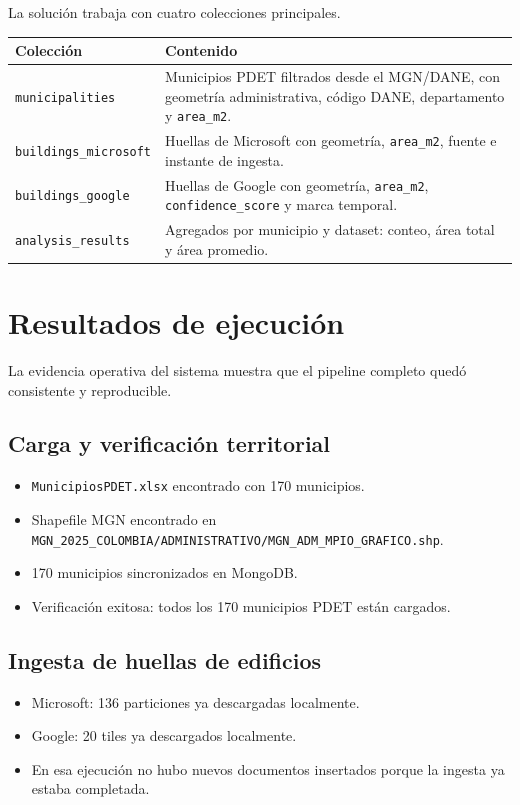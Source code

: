 \documentclass[12pt,a4paper]{article}
\begin{document}
La soluci\'on trabaja con cuatro colecciones principales.

\begin{longtable}{|p{4cm}|p{9.8cm}|}
\hline
\textbf{Colecci\'on} & \textbf{Contenido} \\\hline
\texttt{municipalities} & Municipios PDET filtrados desde el MGN/DANE, con geometr\'ia administrativa, c\'odigo DANE, departamento y \texttt{area\_m2}. \\\hline
\texttt{buildings\_microsoft} & Huellas de Microsoft con geometr\'ia, \texttt{area\_m2}, fuente e instante de ingesta. \\\hline
\texttt{buildings\_google} & Huellas de Google con geometr\'ia, \texttt{area\_m2}, \texttt{confidence\_score} y marca temporal. \\\hline
\texttt{analysis\_results} & Agregados por municipio y dataset: conteo, \'area total y \'area promedio. \\\hline
\end{longtable}

\section{Resultados de ejecuci\'on}

La evidencia operativa del sistema muestra que el pipeline completo qued\'o consistente y reproducible.

\subsection{Carga y verificaci\'on territorial}

\begin{itemize}
  \item \texttt{MunicipiosPDET.xlsx} encontrado con 170 municipios.
  \item Shapefile MGN encontrado en \texttt{MGN\_2025\_COLOMBIA/ADMINISTRATIVO/MGN\_ADM\_MPIO\_GRAFICO.shp}.
  \item 170 municipios sincronizados en MongoDB.
  \item Verificaci\'on exitosa: todos los 170 municipios PDET est\'an cargados.
\end{itemize}

\subsection{Ingesta de huellas de edificios}

\begin{itemize}
  \item Microsoft: 136 particiones ya descargadas localmente.
  \item Google: 20 tiles ya descargados localmente.
  \item En esa ejecuci\'on no hubo nuevos documentos insertados porque la ingesta ya estaba completada.
\end{itemize}
\end{document}
